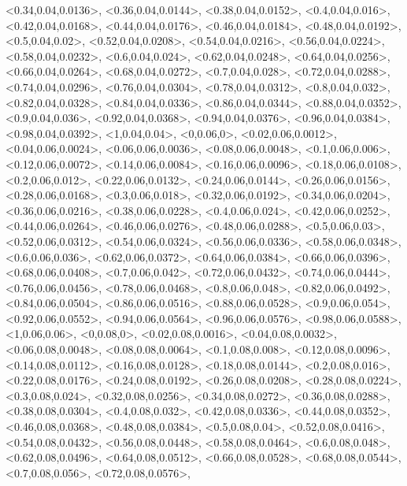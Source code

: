 \documentclass[a4paper,10pt]{article}
\begin{document}
\begin{eulernotebook}
\begin{euleroutput}
  <0.34,0.04,0.0136>,
  <0.36,0.04,0.0144>,
  <0.38,0.04,0.0152>,
  <0.4,0.04,0.016>,
  <0.42,0.04,0.0168>,
  <0.44,0.04,0.0176>,
  <0.46,0.04,0.0184>,
  <0.48,0.04,0.0192>,
  <0.5,0.04,0.02>,
  <0.52,0.04,0.0208>,
  <0.54,0.04,0.0216>,
  <0.56,0.04,0.0224>,
  <0.58,0.04,0.0232>,
  <0.6,0.04,0.024>,
  <0.62,0.04,0.0248>,
  <0.64,0.04,0.0256>,
  <0.66,0.04,0.0264>,
  <0.68,0.04,0.0272>,
  <0.7,0.04,0.028>,
  <0.72,0.04,0.0288>,
  <0.74,0.04,0.0296>,
  <0.76,0.04,0.0304>,
  <0.78,0.04,0.0312>,
  <0.8,0.04,0.032>,
  <0.82,0.04,0.0328>,
  <0.84,0.04,0.0336>,
  <0.86,0.04,0.0344>,
  <0.88,0.04,0.0352>,
  <0.9,0.04,0.036>,
  <0.92,0.04,0.0368>,
  <0.94,0.04,0.0376>,
  <0.96,0.04,0.0384>,
  <0.98,0.04,0.0392>,
  <1,0.04,0.04>,
  <0,0.06,0>,
  <0.02,0.06,0.0012>,
  <0.04,0.06,0.0024>,
  <0.06,0.06,0.0036>,
  <0.08,0.06,0.0048>,
  <0.1,0.06,0.006>,
  <0.12,0.06,0.0072>,
  <0.14,0.06,0.0084>,
  <0.16,0.06,0.0096>,
  <0.18,0.06,0.0108>,
  <0.2,0.06,0.012>,
  <0.22,0.06,0.0132>,
  <0.24,0.06,0.0144>,
  <0.26,0.06,0.0156>,
  <0.28,0.06,0.0168>,
  <0.3,0.06,0.018>,
  <0.32,0.06,0.0192>,
  <0.34,0.06,0.0204>,
  <0.36,0.06,0.0216>,
  <0.38,0.06,0.0228>,
  <0.4,0.06,0.024>,
  <0.42,0.06,0.0252>,
  <0.44,0.06,0.0264>,
  <0.46,0.06,0.0276>,
  <0.48,0.06,0.0288>,
  <0.5,0.06,0.03>,
  <0.52,0.06,0.0312>,
  <0.54,0.06,0.0324>,
  <0.56,0.06,0.0336>,
  <0.58,0.06,0.0348>,
  <0.6,0.06,0.036>,
  <0.62,0.06,0.0372>,
  <0.64,0.06,0.0384>,
  <0.66,0.06,0.0396>,
  <0.68,0.06,0.0408>,
  <0.7,0.06,0.042>,
  <0.72,0.06,0.0432>,
  <0.74,0.06,0.0444>,
  <0.76,0.06,0.0456>,
  <0.78,0.06,0.0468>,
  <0.8,0.06,0.048>,
  <0.82,0.06,0.0492>,
  <0.84,0.06,0.0504>,
  <0.86,0.06,0.0516>,
  <0.88,0.06,0.0528>,
  <0.9,0.06,0.054>,
  <0.92,0.06,0.0552>,
  <0.94,0.06,0.0564>,
  <0.96,0.06,0.0576>,
  <0.98,0.06,0.0588>,
  <1,0.06,0.06>,
  <0,0.08,0>,
  <0.02,0.08,0.0016>,
  <0.04,0.08,0.0032>,
  <0.06,0.08,0.0048>,
  <0.08,0.08,0.0064>,
  <0.1,0.08,0.008>,
  <0.12,0.08,0.0096>,
  <0.14,0.08,0.0112>,
  <0.16,0.08,0.0128>,
  <0.18,0.08,0.0144>,
  <0.2,0.08,0.016>,
  <0.22,0.08,0.0176>,
  <0.24,0.08,0.0192>,
  <0.26,0.08,0.0208>,
  <0.28,0.08,0.0224>,
  <0.3,0.08,0.024>,
  <0.32,0.08,0.0256>,
  <0.34,0.08,0.0272>,
  <0.36,0.08,0.0288>,
  <0.38,0.08,0.0304>,
  <0.4,0.08,0.032>,
  <0.42,0.08,0.0336>,
  <0.44,0.08,0.0352>,
  <0.46,0.08,0.0368>,
  <0.48,0.08,0.0384>,
  <0.5,0.08,0.04>,
  <0.52,0.08,0.0416>,
  <0.54,0.08,0.0432>,
  <0.56,0.08,0.0448>,
  <0.58,0.08,0.0464>,
  <0.6,0.08,0.048>,
  <0.62,0.08,0.0496>,
  <0.64,0.08,0.0512>,
  <0.66,0.08,0.0528>,
  <0.68,0.08,0.0544>,
  <0.7,0.08,0.056>,
  <0.72,0.08,0.0576>,

\end{euleroutput}
\end{eulernotebook}
\end{document}
